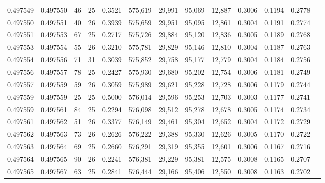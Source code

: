 \begin{tabular}{rrrrrrrrrrrrr}
0.497549 & 0.497550 &  46 &  25 &                                     0.3521 & 575,619 &  29,991 &  95,069 &  12,887 & 0.3006 & 0.1194 & 0.2778 \\
0.497550 & 0.497551 &  40 &  26 &                                     0.3939 & 575,659 &  29,951 &  95,095 &  12,861 & 0.3004 & 0.1191 & 0.2774 \\
0.497551 & 0.497553 &  67 &  25 &                                     0.2717 & 575,726 &  29,884 &  95,120 &  12,836 & 0.3005 & 0.1189 & 0.2768 \\
0.497553 & 0.497554 &  55 &  26 &                                     0.3210 & 575,781 &  29,829 &  95,146 &  12,810 & 0.3004 & 0.1187 & 0.2763 \\
0.497554 & 0.497556 &  71 &  31 &                                     0.3039 & 575,852 &  29,758 &  95,177 &  12,779 & 0.3004 & 0.1184 & 0.2756 \\
0.497556 & 0.497557 &  78 &  25 &                                     0.2427 & 575,930 &  29,680 &  95,202 &  12,754 & 0.3006 & 0.1181 & 0.2749 \\
0.497557 & 0.497559 &  59 &  26 &                                     0.3059 & 575,989 &  29,621 &  95,228 &  12,728 & 0.3006 & 0.1179 & 0.2744 \\
0.497559 & 0.497559 &  25 &  25 &                                     0.5000 & 576,014 &  29,596 &  95,253 &  12,703 & 0.3003 & 0.1177 & 0.2741 \\
0.497559 & 0.497561 &  84 &  25 &                                     0.2294 & 576,098 &  29,512 &  95,278 &  12,678 & 0.3005 & 0.1174 & 0.2734 \\
0.497561 & 0.497562 &  51 &  26 &                                     0.3377 & 576,149 &  29,461 &  95,304 &  12,652 & 0.3004 & 0.1172 & 0.2729 \\
0.497562 & 0.497563 &  73 &  26 &                                     0.2626 & 576,222 &  29,388 &  95,330 &  12,626 & 0.3005 & 0.1170 & 0.2722 \\
0.497563 & 0.497564 &  69 &  25 &                                     0.2660 & 576,291 &  29,319 &  95,355 &  12,601 & 0.3006 & 0.1167 & 0.2716 \\
0.497564 & 0.497565 &  90 &  26 &                                     0.2241 & 576,381 &  29,229 &  95,381 &  12,575 & 0.3008 & 0.1165 & 0.2707 \\
0.497565 & 0.497567 &  63 &  25 &                                     0.2841 & 576,444 &  29,166 &  95,406 &  12,550 & 0.3008 & 0.1163 & 0.2702 \\

\end{tabular}
